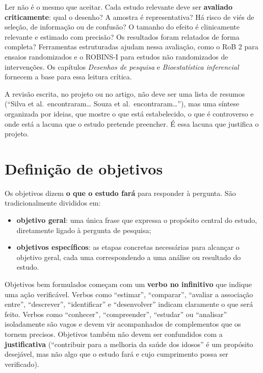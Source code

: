 \documentclass[
]{book}
\providecommand{\tightlist}{%
  \setlength{\itemsep}{0pt}\setlength{\parskip}{0pt}}
\begin{document}
Ler não é o mesmo que aceitar. Cada estudo relevante deve ser \textbf{avaliado criticamente}: qual o desenho? A amostra é representativa? Há risco de viés de seleção, de informação ou de confusão? O tamanho do efeito é clinicamente relevante e estimado com precisão? Os resultados foram relatados de forma completa? Ferramentas estruturadas ajudam nessa avaliação, como o RoB 2 para ensaios randomizados e o ROBINS-I para estudos não randomizados de intervenções. Os capítulos \emph{Desenhos de pesquisa} e \emph{Bioestatística inferencial} fornecem a base para essa leitura crítica.

A revisão escrita, no projeto ou no artigo, não deve ser uma lista de resumos (``Silva et al.~encontraram\ldots{} Souza et al.~encontraram\ldots{}''), mas uma síntese organizada por ideias, que mostre o que está estabelecido, o que é controverso e onde está a lacuna que o estudo pretende preencher. É essa lacuna que justifica o projeto.

\section{Definição de objetivos}\label{definiuxe7uxe3o-de-objetivos}

Os objetivos dizem \textbf{o que o estudo fará} para responder à pergunta. São tradicionalmente divididos em:

\begin{itemize}
\tightlist
\item
  \textbf{objetivo geral}: uma única frase que expressa o propósito central do estudo, diretamente ligado à pergunta de pesquisa;
\item
  \textbf{objetivos específicos}: as etapas concretas necessárias para alcançar o objetivo geral, cada uma correspondendo a uma análise ou resultado do estudo.
\end{itemize}

Objetivos bem formulados começam com um \textbf{verbo no infinitivo} que indique uma ação verificável. Verbos como ``estimar'', ``comparar'', ``avaliar a associação entre'', ``descrever'', ``identificar'' e ``desenvolver'' indicam claramente o que será feito. Verbos como ``conhecer'', ``compreender'', ``estudar'' ou ``analisar'' isoladamente são vagos e devem vir acompanhados de complementos que os tornem precisos. Objetivos também não devem ser confundidos com a \textbf{justificativa} (``contribuir para a melhoria da saúde dos idosos'' é um propósito desejável, mas não algo que o estudo fará e cujo cumprimento possa ser verificado).
\end{document}

